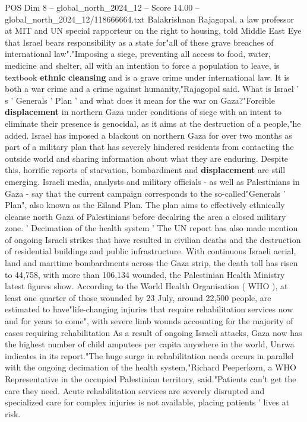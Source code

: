 \begin{textsample}{POS Dim 8 – global\_north\_2024\_12 – Score 14.00 – global\_north\_2024\_12/118666664.txt}
Balakrishnan Rajagopal, a law professor at MIT and UN special rapporteur on the right to housing, told Middle East Eye that Israel bears responsibility as a state for"all of these grave breaches of international law"."Imposing a siege, preventing all access to food, water, medicine and shelter, all with an intention to force a population to leave, is textbook \textbf{ethnic} \textbf{cleansing} and is a grave crime under international law.
It is both a war crime and a crime against humanity,"Rajagopal said.
What is Israel ' s ' Generals ' Plan ' and what does it mean for the war on Gaza?"Forcible \textbf{displacement} in northern Gaza under conditions of siege with an intent to eliminate their presence is genocidal, as it aims at the destruction of a people,"he added.
Israel has imposed a blackout on northern Gaza for over two months as part of a military plan that has severely hindered residents from contacting the outside world and sharing information about what they are enduring.
Despite this, horrific reports of starvation, bombardment and \textbf{displacement} are still emerging.
Israeli media, analysts and military officials - as well as Palestinians in Gaza - say that the current campaign corresponds to the so-called"Generals ' Plan", also known as the Eiland Plan.
The plan aims to effectively ethnically cleanse north Gaza of Palestinians before decalring the area a closed military zone. ' Decimation of the health system ' The UN report has also made mention of ongoing Israeli strikes that have resulted in civilian deaths and the destruction of residential buildings and public infrastructure.
With continuous Israeli aerial, land and maritime bombardments across the Gaza strip, the death toll has risen to 44,758, with more than 106,134 wounded, the Palestinian Health Ministry latest figures show.
According to the World Health Organisation ( WHO ), at least one quarter of those wounded by 23 July, around 22,500 people, are estimated to have"life-changing injuries that require rehabilitation services now and for years to come", with severe limb wounds accounting for the majority of cases requiring rehabilitation As a result of ongoing Israeli attacks, Gaza now has the highest number of child amputees per capita anywhere in the world, Unrwa indicates in its report."The huge surge in rehabilitation needs occurs in parallel with the ongoing decimation of the health system,"Richard Peeperkorn, a WHO Representative in the occupied Palestinian territory, said."Patients can't get the care they need.
Acute rehabilitation services are severely disrupted and specialized care for complex injuries is not available, placing patients ' lives at risk.

\end{textsample}

